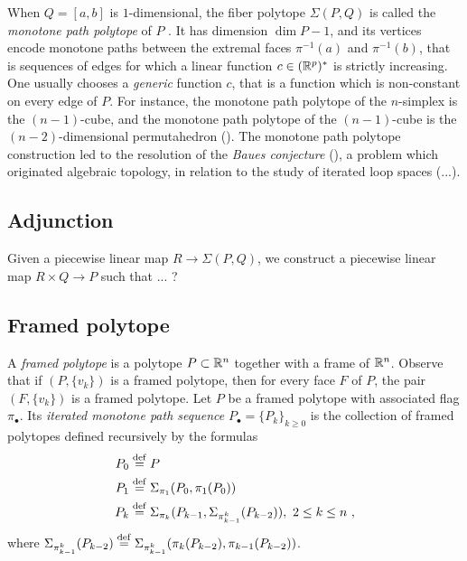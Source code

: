 When $Q=[a,b]$ is $1$-dimensional, the fiber polytope $\Sigma(P,Q)$ is called the \emph{monotone path polytope} of $P$ \cite[Theorem 5.3]{BilleraSturmfels92}. 
It has dimension $\dim P -1$, and its vertices encode monotone paths between the extremal faces $\pi^{-1}(a)$ and $\pi^{-1}(b)$, that is sequences of edges for which a linear function $c \in (\mathbb{R}^p)^{*}$ is strictly increasing. 
One usually chooses a \emph{generic} function $c$, that is a function which is non-constant on every edge of $P$. 
For instance, the monotone path polytope of the $n$-simplex is the $(n-1)$-cube, and the monotone path polytope of the $(n-1)$-cube is the $(n-2)$-dimensional permutahedron (). 
The monotone path polytope construction led to the resolution of the \emph{Baues conjecture} (), a problem which originated algebraic topology, in relation to the study of iterated loop spaces (...). 

\subsection{Adjunction}

Given a piecewise linear map $R \to \Sigma(P,Q)$, we construct a piecewise linear map $R \times Q \to P$ such that ... ? 

\subsection{Framed polytope}

A \textit{framed polytope} is a polytope $P \subset \mathbb{R}^n$ together with a frame of $\mathbb{R}^n$.
Observe that if $(P, \{v_k\})$ is a framed polytope, then for every face $F$ of $P$, the pair $(F, \{v_k\})$ is a framed polytope.
Let $P$ be a framed polytope with associated flag $\pi_\bullet$.
Its \textit{iterated monotone path sequence} $P_\bullet = \{P_k\}_{k \geq 0}$ is the collection of framed polytopes defined recursively by the formulas
\begin{align*}
	P_0 & \stackrel{\mathrm{def}}{=} P \\
	P_1 & \stackrel{\mathrm{def}}{=} \Sigma_{\pi_1}(P_0,\pi_1(P_0)) \\
	P_k & \stackrel{\mathrm{def}}{=} \Sigma_{\pi_k}(P_{k-1},\Sigma_{\pi^{k}_{k-1}}(P_{k-2})), \ 2 \leq k \leq n \ ,
\end{align*}
where $\Sigma_{\pi^{k}_{k-1}}(P_{k-2})\stackrel{\mathrm{def}}{=} \Sigma_{\pi^{k}_{k-1}}(\pi_k(P_{k-2}),\pi_{k-1}(P_{k-2}))$.


